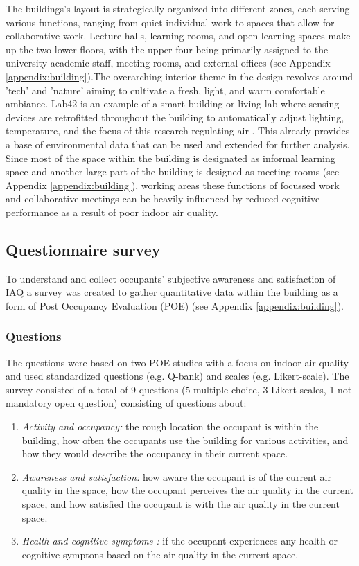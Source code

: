 The buildings's layout is strategically organized into different zones, each serving various functions, ranging from quiet individual work to spaces that allow for collaborative work. Lecture halls, learning rooms, and open learning spaces make up the two lower floors, with the upper four being primarily assigned to the university academic staff, meeting rooms, and external offices (see Appendix \ref{appendix:building}).The overarching interior theme in the design revolves around 'tech' and 'nature' aiming to cultivate a fresh, light, and warm comfortable ambiance. Lab42 is an example of a smart building or living lab where sensing devices are retrofitted throughout the building to automatically adjust lighting, temperature, and the focus of this research regulating air \cite{architects_lab42_2022}. This already provides a base of environmental data that can be used and extended for further analysis. Since most of the space within the building is designated as informal learning space and another large part of the building is designed as meeting rooms (see Appendix \ref{appendix:building}), working areas these functions of focussed work and collaborative meetings can be heavily influenced by reduced cognitive performance as a result of poor indoor air quality.

\subsection{Questionnaire survey}
\label{sec:questionnaire}

To understand and collect occupants' subjective awareness and satisfaction of IAQ  a survey was created to gather quantitative data within the building as a form of Post Occupancy Evaluation (POE) (see Appendix \ref{appendix:building}).


\subsubsection{Questions}
The questions were based on two POE studies with a focus on indoor air quality \cite{silva_post-occupancy_2017, son_perceived_2023} and used standardized questions (e.g. Q-bank) and scales (e.g. Likert-scale). The survey consisted of a total of 9 questions (5 multiple choice, 3 Likert scales, 1 not mandatory open question) consisting of questions about:

\begin{enumerate}
  \item \textit{Activity and occupancy:} the rough location the occupant is within the building, how often the occupants use the building for various activities, and how they would describe the occupancy in their current space.
  \item \textit{Awareness and satisfaction:} how aware the occupant is of the current air quality in the space, how the occupant perceives the air quality in the current space, and how satisfied the occupant is with the air quality in the current space.
  \item \textit{Health and cognitive symptoms :} if the occupant experiences any health or cognitive symptons based on the air quality in the current space.
\end{enumerate}


